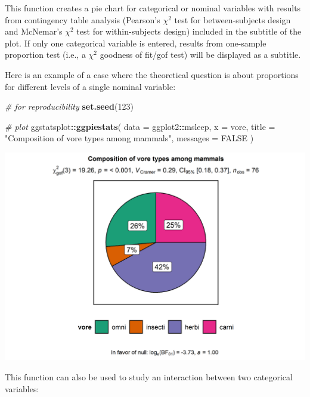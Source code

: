 \documentclass[]{article}
\newenvironment{Shaded}{\begin{snugshade}}{\end{snugshade}}
\newcommand{\CommentTok}[1]{\textcolor[rgb]{0.56,0.35,0.01}{\textit{#1}}}
\newcommand{\DataTypeTok}[1]{\textcolor[rgb]{0.13,0.29,0.53}{#1}}
\newcommand{\DecValTok}[1]{\textcolor[rgb]{0.00,0.00,0.81}{#1}}
\newcommand{\KeywordTok}[1]{\textcolor[rgb]{0.13,0.29,0.53}{\textbf{#1}}}
\newcommand{\NormalTok}[1]{#1}
\newcommand{\OperatorTok}[1]{\textcolor[rgb]{0.81,0.36,0.00}{\textbf{#1}}}
\newcommand{\OtherTok}[1]{\textcolor[rgb]{0.56,0.35,0.01}{#1}}
\newcommand{\StringTok}[1]{\textcolor[rgb]{0.31,0.60,0.02}{#1}}
\begin{document}
This function creates a pie chart for categorical or nominal variables with
results from contingency table analysis (Pearson's \(\chi^2\) test for
between-subjects design and McNemar's \(\chi^2\) test for within-subjects design)
included in the subtitle of the plot. If only one categorical variable is
entered, results from one-sample proportion test (i.e., a \(\chi^2\) goodness of
fit/gof test) will be displayed as a subtitle.

Here is an example of a case where the theoretical question is about proportions
for different levels of a single nominal variable:

\begin{Shaded}
\begin{Highlighting}[]
\CommentTok{# for reproducibility}
\KeywordTok{set.seed}\NormalTok{(}\DecValTok{123}\NormalTok{)}

\CommentTok{# plot}
\NormalTok{ggstatsplot}\OperatorTok{::}\KeywordTok{ggpiestats}\NormalTok{(}
  \DataTypeTok{data =}\NormalTok{ ggplot2}\OperatorTok{::}\NormalTok{msleep,}
  \DataTypeTok{x =}\NormalTok{ vore,}
  \DataTypeTok{title =} \StringTok{"Composition of vore types among mammals"}\NormalTok{,}
  \DataTypeTok{messages =} \OtherTok{FALSE}
\NormalTok{)}
\end{Highlighting}
\end{Shaded}

\includegraphics[width=1\linewidth]{./figures/paper-ggpiestats1-1}

This function can also be used to study an interaction between two categorical
variables:
\end{document}
